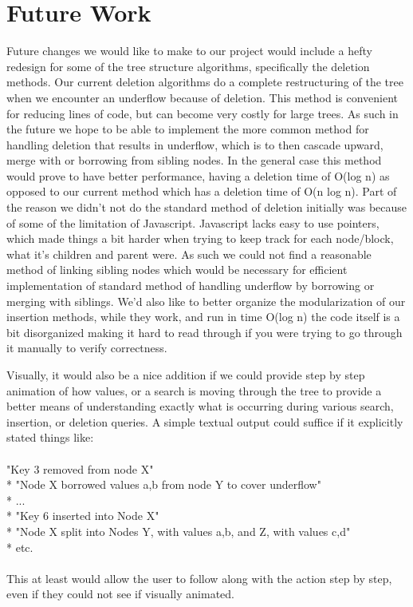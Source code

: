 \section{Future Work}

Future changes we would like to make to our project would include a
hefty redesign for some of the tree structure algorithms, specifically
the deletion methods.  Our current deletion algorithms do a complete
restructuring of the tree when we encounter an underflow because of
deletion.  This method is convenient for reducing lines of code, but
can become very costly for large trees.  As such in the future we hope
to be able to implement the more common method for handling deletion
that results in underflow, which is to then cascade upward, merge with
or borrowing from sibling nodes.  In the general case this method
would prove to have better performance, having a deletion time of
O(log n) as opposed to our current method which has a deletion time
of O(n log n).  Part of the reason we didn't not do the standard
method of deletion initially was because of some of the limitation of
Javascript.  Javascript lacks easy to use pointers, which made things
a bit harder when trying to keep track for each node/block, what it's
children and parent were.  As such we could not find a reasonable
method of linking sibling nodes which would be necessary for efficient
implementation of standard method of handling underflow by borrowing
or merging with siblings.  We'd also like to better organize the
modularization of our insertion methods, while they work, and run in
time O(log n) the code itself is a bit disorganized making it hard to
read through if you were trying to go through it manually to verify
correctness.

Visually, it would also be a nice addition if we could provide step by
step animation of how values, or a search is moving through the tree
to provide a better means of understanding exactly what is occurring
during various search, insertion, or deletion queries.  A simple
textual output could suffice if it explicitly stated things like:
\\ \\
"Key 3 removed from node X"
\\*
"Node X borrowed values a,b from node Y to cover underflow"
\\*
...
\\*
"Key 6 inserted into Node X"
\\*
"Node X split into Nodes Y, with values a,b, and Z, with values c,d"
\\*
etc.
\\ \\
This at least would allow the user to follow along with the action step
by step, even if they could not see if visually animated.


